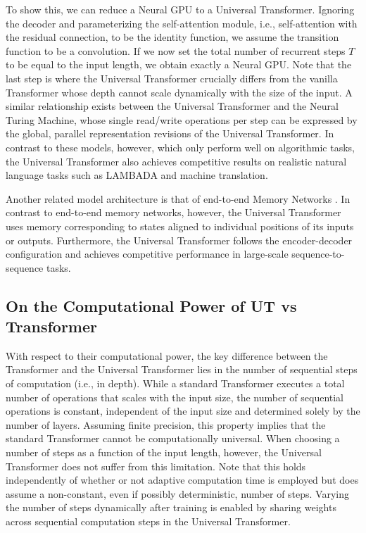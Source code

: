 To show this, we can reduce a Neural GPU to a Universal Transformer. Ignoring the decoder and parameterizing the self-attention module, i.e., self-attention with the residual connection, to be the identity function, we assume the transition function to be a convolution. If we now set the total number of recurrent steps $T$ to be equal to the input length, we obtain exactly a Neural GPU. Note that the last step is where the Universal Transformer crucially differs from the vanilla Transformer whose depth cannot scale dynamically with the size of the input. A similar relationship exists between the Universal Transformer and the Neural Turing Machine, whose single read/write operations per step can be expressed by the global, parallel representation revisions of the Universal Transformer. In contrast to these models, however, which only perform well on algorithmic tasks, the Universal Transformer also achieves competitive results on realistic natural language tasks such as LAMBADA and machine translation.

Another related model architecture is that of end-to-end Memory Networks \citep{sukhbaatar2015}. In contrast to end-to-end memory networks, however, the Universal Transformer uses memory corresponding to states aligned to individual positions of its inputs or outputs. Furthermore, the Universal Transformer follows the encoder-decoder configuration and achieves competitive performance in large-scale sequence-to-sequence tasks.


\subsection{On the Computational Power of UT vs Transformer}
\label{app:univerrality_example}

With respect to their computational power, the key difference between the Transformer and the Universal Transformer lies in the number of sequential steps of computation (i.e., in depth). While a standard Transformer executes a total number of operations that scales with the input size, the number of sequential operations is constant, independent of the input size and determined solely by the number of layers. Assuming finite precision, this property implies that the standard Transformer cannot be computationally universal. When choosing a number of steps as a function of the input length, however, the Universal Transformer does not suffer from this limitation. Note that this holds independently of whether or not adaptive computation time is employed but does assume a non-constant, even if possibly deterministic, number of steps. Varying the number of steps dynamically after training is enabled by sharing weights across sequential computation steps in the Universal Transformer.

